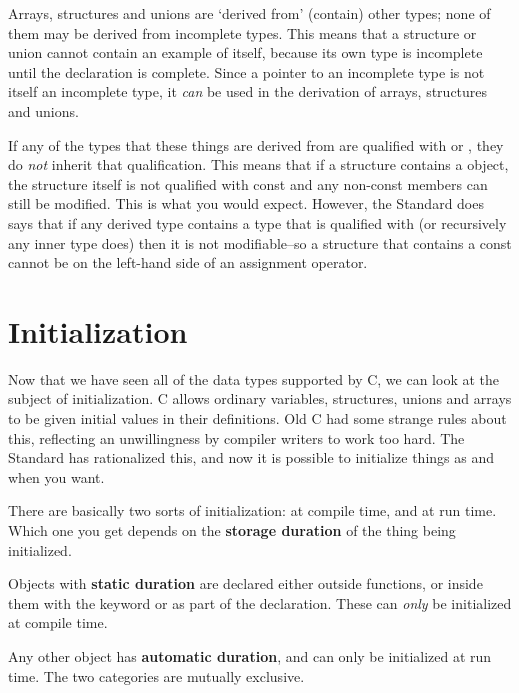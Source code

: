   

  Arrays, structures and unions are `derived from' (contain) other
   types; none of them may be derived from incomplete types. This means that
   a structure or union cannot contain an example of itself, because its own
   type is incomplete until the declaration is complete. Since a pointer to an
   incomplete type is not itself an incomplete type, it \textit{can} be used in
   the derivation of arrays, structures and unions.


  If any of the types that these things are derived from are qualified with
   \const{} or \volatile, they do \textit{not} inherit
   that qualification. This means that if a structure contains
   a \const{} object, the structure itself is not qualified with
   const and any non-const members can still be modified. This is what you
   would expect. However, the Standard does says that if any derived type
   contains a type that is qualified with \const{} (or recursively
   any inner type does) then it is not modifiable--so a structure that
   contains a const cannot be on the left-hand side of an assignment
   operator.


 
        \section{Initialization}
        

  

  Now that we have seen all of the data types supported by C, we can look at
   the subject of initialization. C allows ordinary variables, structures,
   unions and arrays to be given initial values in their definitions. Old C had
   some strange rules about this, reflecting an unwillingness by compiler
   writers to work too hard. The Standard has rationalized this, and now it is
   possible to initialize things as and when you want.


  There are basically two sorts of initialization: at compile time, and at
   run time. Which one you get depends on the \textbf{storage duration} of
   the thing being initialized.


  Objects with \textbf{static duration} are declared either outside
   functions, or inside them with the keyword \extern{} or
   \static{} as part of the declaration. These can \textit{only} be
   initialized at compile time.


  Any other object has \textbf{automatic duration}, and can only be
   initialized at run time. The two categories are mutually exclusive.


